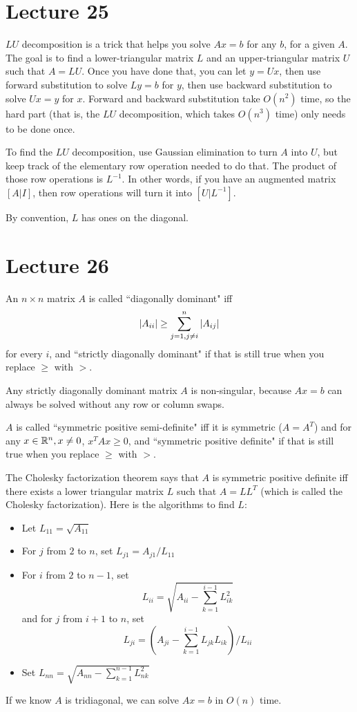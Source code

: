 \documentclass{article}
\begin{document}
\section{Lecture 25}
$LU$ decomposition is a trick that helps you solve $Ax=b$ for any $b$, for a given $A$. The goal is to find a lower-triangular matrix $L$ and an upper-triangular matrix $U$ such that $A=LU$. Once you have done that, you can let $y=Ux$, then use forward substitution to solve $Ly=b$ for $y$, then use backward substitution to solve $Ux=y$ for $x$. Forward and backward substitution take $O(n^2)$ time, so the hard part (that is, the $LU$ decomposition, which takes $O(n^3)$ time) only needs to be done once.
\par
To find the $LU$ decomposition, use Gaussian elimination to turn $A$ into $U$, but keep track of the elementary row operation needed to do that. The product of those row operations is $L^{-1}$. In other words, if you have an augmented matrix $[A|I]$, then row operations will turn it into $[U|L^{-1}]$.
\par
By convention, $L$ has ones on the diagonal.

\section{Lecture 26}
An $n \times n$ matrix $A$ is called ``diagonally dominant" iff
\[ \left\lvert A_{ii} \right\rvert \geq \sum_{j=1,j\neq i}^n \left\lvert A_{ij} \right\rvert \]
for every $i$, and ``strictly diagonally dominant" if that is still true when you replace $\geq$ with $>$.
\par
Any strictly diagonally dominant matrix $A$ is non-singular, because $Ax=b$ can always be solved without any row or column swaps.
\par
$A$ is called ``symmetric positive semi-definite" iff it is symmetric ($A=A^T$) and for any $x \in \mathbb{R}^n, x \neq 0$, $x^T A x \geq 0$, and ``symmetric positive definite" if that is still true when you replace $\geq$ with $>$.
\par
The Cholesky factorization theorem says that $A$ is symmetric positive definite iff there exists a lower triangular matrix $L$ such that $A=LL^T$ (which is called the Cholesky factorization). Here is the algorithms to find $L$:
\begin{itemize}
    \item Let $L_{11}= \sqrt{A_{11}}$
    \item For $j$ from $2$ to $n$, set $L_{j1}=A_{j1}/L_{11}$
    \item For $i$ from $2$ to $n-1$, set
        \[ L_{ii}= \sqrt{ A_{ii}-\sum_{k=1}^{i-1} L_{ik}^2 } \]
        and for $j$ from $i+1$ to $n$, set
        \[ L_{ji} = \left( A_{ji}-\sum_{k=1}^{i-1} L_{jk}L_{ik} \right) / L_{ii} \]
    \item Set $L_{nn} = \sqrt{A_{nn} - \sum_{k=1}^{n-1} L_{nk}^2}$
\end{itemize}
If we know $A$ is tridiagonal, we can solve $Ax=b$ in $O(n)$ time.
\end{document}

